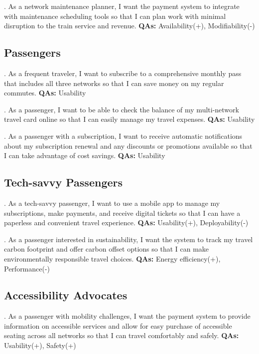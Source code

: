 . As a network maintenance planner, I want the payment system to integrate with maintenance scheduling tools so that I can plan work with minimal disruption to the train service and revenue. \textbf{QAs:} Availability(+), Modifiability(-)

\subsection{Passengers}

. As a frequent traveler, I want to subscribe to a comprehensive monthly pass that includes all three networks so that I can save money on my regular commutes. \textbf{QAs:} Usability

. As a passenger, I want to be able to check the balance of my multi-network travel card online so that I can easily manage my travel expenses. \textbf{QAs:} Usability

. As a passenger with a subscription, I want to receive automatic notifications about my subscription renewal and any discounts or promotions available so that I can take advantage of cost savings. \textbf{QAs:} Usability

\subsection{Tech-savvy Passengers}

. As a tech-savvy passenger, I want to use a mobile app to manage my subscriptions, make payments, and receive digital tickets so that I can have a paperless and convenient travel experience. \textbf{QAs:} Usability(+), Deployability(-)

. As a passenger interested in sustainability, I want the system to track my travel carbon footprint and offer carbon offset options so that I can make environmentally responsible travel choices. \textbf{QAs:} Energy efficiency(+), Performance(-)

\subsection{Accessibility Advocates}

. As a passenger with mobility challenges, I want the payment system to provide information on accessible services and allow for easy purchase of accessible seating across all networks so that I can travel comfortably and safely. \textbf{QAs:} Usability(+), Safety(+)

